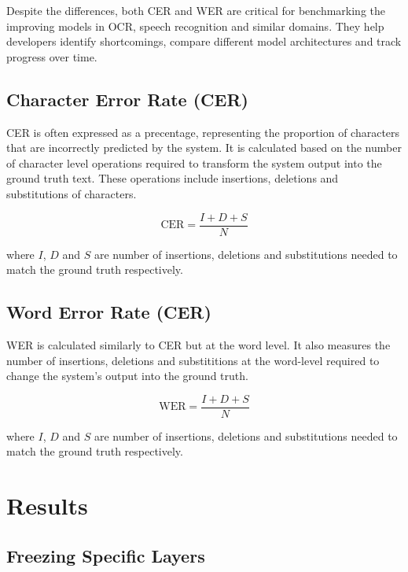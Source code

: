 Despite the differences, both CER and WER are critical for benchmarking the improving models in OCR, speech recognition and similar domains. They help developers identify shortcomings, compare different model architectures and track progress over time.

\subsection{Character Error Rate (CER)}
\label{subsec:5_cer}
CER is often expressed as a precentage, representing the proportion of characters that are incorrectly predicted by the system. It is calculated based on the number of character level operations required to transform the system output into the ground truth text. These operations include insertions, deletions and substitutions of characters.

\begin{equation}
    \text{CER} = \frac{I+D+S}{N}
\end{equation}

where $I$, $D$ and $S$ are number of insertions, deletions and substitutions needed to match the ground truth respectively.

\subsection{Word Error Rate (CER)}
\label{subsec:5_wer}
WER is calculated similarly to CER but at the word level. It also measures the number of insertions, deletions and substititions at the word-level required to change the system's output into the ground truth.

\begin{equation}
    \text{WER} = \frac{I+D+S}{N}
\end{equation}

where $I$, $D$ and $S$ are number of insertions, deletions and substitutions needed to match the ground truth respectively.
\section{Results}
\label{sec:5_results}
\subsection{Freezing Specific Layers}
\label{subsec:5_freezing_specific_layers}
